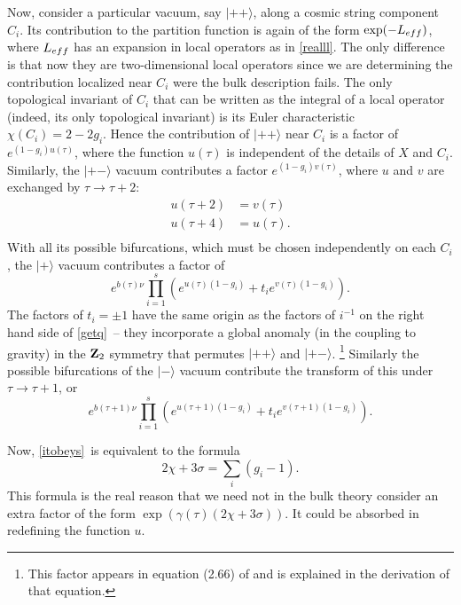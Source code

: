 \documentclass[12pt]{article}
\numberwithin{equation}{section}
\begin{document}
Now, consider a particular vacuum, say $|++\rangle$, along a cosmic
string component $C_i$.
Its contribution to the partition function is again of the form
$\exp(-L_{\mit eff})$, where $L_{\mit eff}$ has an expansion in local
operators as in \eqref{realll}.  The only difference is that now they are
two-dimensional local operators since we are determining the contribution
localized near $C_i$ were the bulk description fails.  The only
topological invariant of $C_i$ that can be written as the integral
of a local operator (indeed, its only topological invariant)
is its Euler characteristic $\chi(C_i)=2-2g_i$.
Hence the contribution of $|++\rangle$ near $C_i$ is a factor
of $e^{(1-g_i)u(\tau)}$, where the function $u(\tau)$ is independent of the
details of $X$ and $C_i$.  Similarly, the $|+-\rangle$ vacuum contributes
a factor $e^{(1-g_i)v(\tau)}$, where $u$ and $v$ are exchanged by
$\tau\to \tau+2$:
\begin{equation}
  \label{rtrans}
  \begin{aligned}u(\tau+2) & = v(\tau) \\ u(\tau+4) & = u(\tau) .\\
  \end{aligned}
\end{equation}
With all its possible bifurcations, which must
be chosen independently on each $C_i$, the $|+\rangle$ vacuum contributes
a factor
of
\begin{equation}
  \label{confac}
  e^{b(\tau)\nu}\prod_{i=1}^s\left(e^{u(\tau)(1-g_i)}
  +t_ie^{v(\tau)(1-g_i)}\right).
\end{equation}
The factors of $t_i=\pm 1$ have  the same origin as the factors of $i^{-1}$
on the right hand side of \eqref{getq}\ -- they incorporate a global anomaly
(in the coupling to gravity) in the ${\bf Z}_2$ symmetry that permutes
$|++\rangle$ and $|+-\rangle$. \footnote{This factor appears in
  equation (2.66) of \cite{switten} and is explained in the derivation
of that equation.}
Similarly the possible bifurcations of the $|-\rangle$ vacuum contribute
the transform of this under $\tau\to\tau+1$, or
\begin{equation}
  \label{onfac}
  e^{b(\tau+1)\nu}\prod_{i=1}^s\left(e^{u(\tau+1)(1-g_i)} +t_i
  e^{v(\tau+1)(1-g_i)}\right).
\end{equation}

Now, \eqref{itobeys}\ is equivalent to the formula
\begin{equation}
  \label{twoc}
  2\chi+3\sigma=\sum_i(g_i-1).
\end{equation}
This formula is the real reason that we need not in the bulk theory
consider an extra factor of the form $\exp(\gamma(\tau)(2\chi+3\sigma))$.
It could be absorbed in redefining the function $u$.
\end{document}
